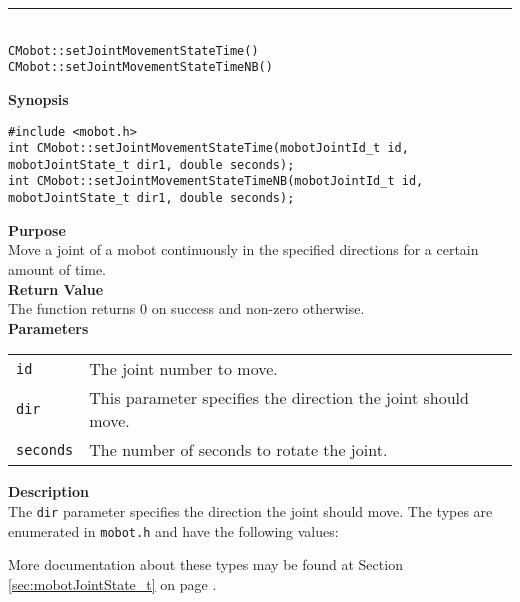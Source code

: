 \noindent
\vspace{5pt}
\rule{4.5in}{0.015in}\\
\noindent
{\LARGE \texttt{CMobot::setJointMovementStateTime()}}\\
{\LARGE \texttt{CMobot::setJointMovementStateTimeNB()}}\\
{}

\noindent
{\bf Synopsis}
\vspace{-8pt}
\begin{verbatim}
#include <mobot.h>
int CMobot::setJointMovementStateTime(mobotJointId_t id, mobotJointState_t dir1, double seconds);
int CMobot::setJointMovementStateTimeNB(mobotJointId_t id, mobotJointState_t dir1, double seconds);
\end{verbatim}

\noindent
{\bf Purpose}\\
Move a joint of a mobot continuously in the specified directions for a certain amount of time.\\

\noindent
{\bf Return Value}\\
The function returns 0 on success and non-zero otherwise.\\

\noindent
{\bf Parameters}\\
\vspace{-0.1in}
\begin{description}
\item               
\begin{tabular}{p{10 mm}p{145 mm}}
\texttt{id} & The joint number to move. \\
\texttt{dir} & This parameter specifies the direction the joint should move. \\
\texttt{seconds} & The number of seconds to rotate the joint. \\
\end{tabular}
\end{description}

\noindent
{\bf Description}\\
The \texttt{dir} parameter specifies the direction the joint should move.
The types
are enumerated in \texttt{mobot.h} and have the following values:

More documentation about these types may be found at Section
\ref{sec:mobotJointState_t} on page
\pageref{sec:mobotJointState_t}.  

